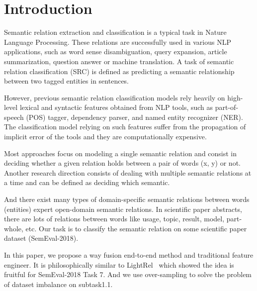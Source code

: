 \section{Introduction}
\label{sec:introduction}

Semantic relation extraction and classification is a typical task in Nature Language Processing. These relations are successfully used in various NLP applications, such as word sense disambiguation, query expansion, article summarization, question answer or machine translation. A task of semantic relation classification (SRC) is defined as predicting a semantic relationship between two tagged entities in sentences.

However, previous semantic relation classification models rely heavily on high-level lexical and syntactic features obtained from NLP tools, such as part-of-speech (POS) tagger, dependency parser, and named entity recognizer (NER). The classification model relying on such features suffer from the propagation of implicit error of the tools and they are computationally expensive.

Most approaches focus on modeling a single semantic relation and consist in deciding whether a given relation holds between a pair of words (x, y) or not. Another research direction consists of dealing with multiple semantic relations at a time and can be defined as deciding which semantic.

And there exist many types of domain-specific semantic relations between words (entities) expert open-domain semantic relations. In scientific paper abstracts, there are lots of relations between words like usage, topic, result, model, part-whole, etc. Our task is to classify the semantic relation on some scientific paper dataset (SemEval-2018).

In this paper, we propose a way fusion end-to-end method and traditional feature engineer. It is philosophically similar to LightRel~\cite{renslow2018lightrel} which showed the idea is fruitful for SemEval-2018 Task 7. And we use over-sampling to solve the problem of dataset imbalance on subtask1.1.